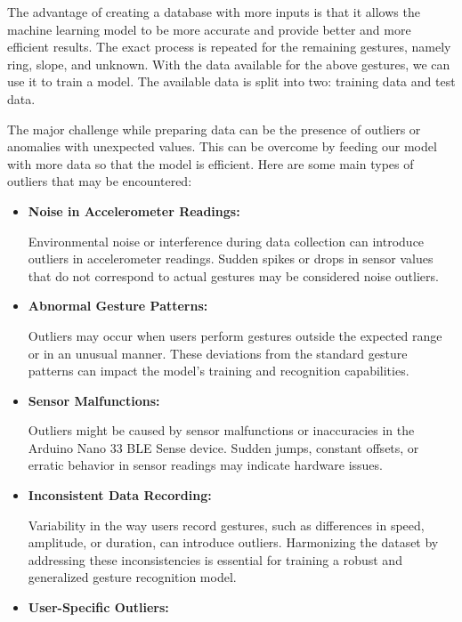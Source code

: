 The advantage of creating a database with more inputs is that it allows the machine learning model to be more accurate and provide better and more efficient results. The exact process is repeated for the remaining gestures, namely ring, slope, and unknown. With the data available for the above gestures, we can use it to train a model. The available data is split into two: training data and test data.

The major challenge while preparing data can be the presence of outliers or anomalies with unexpected values. This can be overcome by feeding our model with more data so that the model is efficient. Here are some main types of outliers that may be encountered:\cite{Munoz:2019}

\begin{itemize}
    
    \item \textbf{Noise in Accelerometer Readings:}
    
    Environmental noise or interference during data collection can introduce outliers in accelerometer readings. Sudden spikes or drops in sensor values that do not correspond to actual gestures may be considered noise outliers. 
    
    \item  \textbf{Abnormal Gesture Patterns:}
    
    Outliers may occur when users perform gestures outside the expected range or in an unusual manner. These deviations from the standard gesture patterns can impact the model's training and recognition capabilities.
    
    \item \textbf{Sensor Malfunctions:}
    
    Outliers might be caused by sensor malfunctions or inaccuracies in the Arduino Nano 33 BLE Sense device. Sudden jumps, constant offsets, or erratic behavior in sensor readings may indicate hardware issues.
    
    \item \textbf{Inconsistent Data Recording:}
    
    Variability in the way users record gestures, such as differences in speed, amplitude, or duration, can introduce outliers. Harmonizing the dataset by addressing these inconsistencies is essential for training a robust and generalized gesture recognition model.
    
    \item \textbf{User-Specific Outliers:}
    

\end{itemize}
